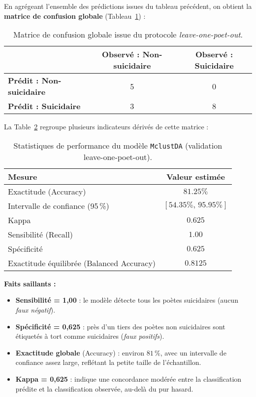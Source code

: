 En agrégeant l’ensemble des prédictions issues du tableau précédent, on obtient la \textbf{matrice de confusion globale} (Tableau~\ref{tab:conf-matrix}) :

\begin{table}[H]
	\centering
	\caption{Matrice de confusion globale issue du protocole \emph{leave-one-poet-out}.}
	\label{tab:conf-matrix}
	\begin{tabular}{lcc}
		\toprule
		& \textbf{Observé : Non-suicidaire} & \textbf{Observé : Suicidaire} \\
		\midrule
		\textbf{Prédit : Non-suicidaire} & 5 & 0 \\
		\textbf{Prédit : Suicidaire}     & 3 & 8 \\
		\bottomrule
	\end{tabular}
\end{table}

La Table~\ref{tab:conf-stats} regroupe plusieurs indicateurs dérivés de cette matrice :

\begin{table}[H]
	\centering
	\caption{Statistiques de performance du modèle \texttt{MclustDA} (validation leave-one-poet-out).}
	\label{tab:conf-stats}
	\begin{tabular}{lc}
		\toprule
		\textbf{Mesure} & \textbf{Valeur estimée} \\
		\midrule
		Exactitude (Accuracy)            & \(81.25\%\) \\
		Intervalle de confiance (95\,\%)  & \([54.35\%,\,95.95\%]\) \\
		Kappa                             & \(0.625\) \\
		Sensibilité (Recall)             & \(1.00\) \\
		Spécificité                       & \(0.625\) \\
		Exactitude équilibrée (Balanced Accuracy) & \(0.8125\) \\
		\bottomrule
	\end{tabular}
\end{table}

\noindent
\textbf{Faits saillants :}
\begin{itemize}
	\item \textbf{Sensibilité = 1,00} : le modèle détecte tous les poètes suicidaires (aucun \emph{faux négatif}).  
	\item \textbf{Spécificité = 0,625} : près d’un tiers des poètes non suicidaires sont étiquetés à tort comme suicidaires (\emph{faux positifs}).  
	\item \textbf{Exactitude globale} (Accuracy) : environ \(81\,\%\), avec un intervalle de confiance assez large, reflétant la petite taille de l’échantillon.  
	\item \textbf{Kappa = 0,625} : indique une concordance modérée entre la classification prédite et la classification observée, au-delà du pur hasard.
\end{itemize}

